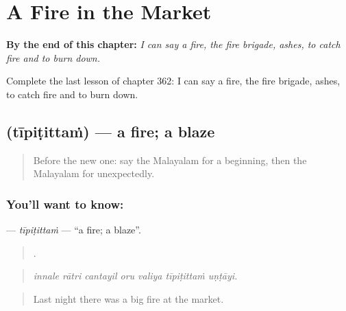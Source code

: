 
\chapter{A Fire in the Market}
\label{ch:ml-a-fire-in-the-market}

\begin{chapteropening}
\textbf{By the end of this chapter:} \emph{I can say a fire, the fire brigade, ashes, to catch fire and to burn down.}

Complete the last lesson of chapter 362: I can say a fire, the fire brigade, ashes, to catch fire and to burn down.
\end{chapteropening}

\section[\texorpdfstring{\ml{തീപിടിത്തം} (tīpiṭittaṁ)}{തീപിടിത്തം (tīpiṭittaṁ)}]{ (tīpiṭittaṁ) — a fire; a blaze}

\label{lesson:ML-C362-tipitittam}



\begin{quote}
Before the new one: say the Malayalam for a beginning, then the Malayalam for unexpectedly.
\end{quote}

\subsection*{You'll want to know: }
\textbf{} — \emph{tīpiṭittaṁ} — \textquotedblleft{}a fire; a blaze\textquotedblright{}.

\begin{quote}
      .
\end{quote}

\begin{quote}
\emph{innale rātri cantayil oru valiya tīpiṭittaṁ uṇṭāyi.}
\end{quote}

\begin{quote}
Last night there was a big fire at the market.
\end{quote}

